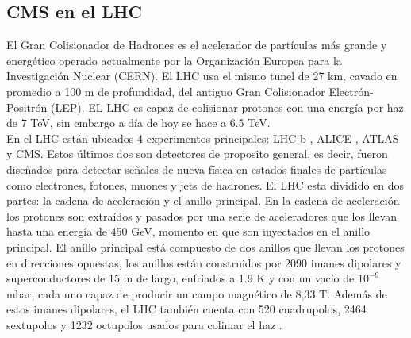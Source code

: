 \subsection{CMS en el LHC}

El Gran Colisionador de Hadrones es el acelerador de partículas más grande y energético operado actualmente por la Organización Europea para la Investigación Nuclear (CERN). El LHC usa el mismo tunel de 27 km, cavado en promedio a 100 m de profundidad, del antiguo Gran Colisionador Electrón-Positrón (LEP). EL LHC es capaz de colisionar protones con una energía por haz de 7 TeV, sin embargo a día de hoy se hace a 6.5 TeV.
\\

En el LHC están ubicados 4 experimentos principales: LHC-b \cite{Alves:2008zz}, ALICE \cite{Aamodt:2008zz}, ATLAS \cite{Aad:2008zzm} y CMS. Estos últimos dos son detectores de proposito general, es decir, fueron diseñados para detectar señales de nueva física en estados finales de partículas como electrones, fotones, muones y jets de hadrones. El LHC esta dividido en dos partes: la cadena de aceleración y el anillo principal. En la cadena de aceleración los protones son extraídos y pasados por una serie de aceleradores que los llevan hasta una energía de 450 GeV, momento en que son inyectados en el anillo principal. El anillo principal está compuesto de dos anillos que llevan los protones en direcciones opuestas, los anillos están construidos por 2090 imanes dipolares y superconductores de 15 m de largo, enfriados a 1.9 K y con un vacío de $10^{-9}$mbar; cada uno capaz de producir un campo magnético de 8,33 T. Además de estos imanes dipolares, el LHC también cuenta con 520 cuadrupolos, 2464 sextupolos y 1232 octupolos usados para colimar el haz \cite{RuizAlvarez:2016mhn}. 
\\
\\

